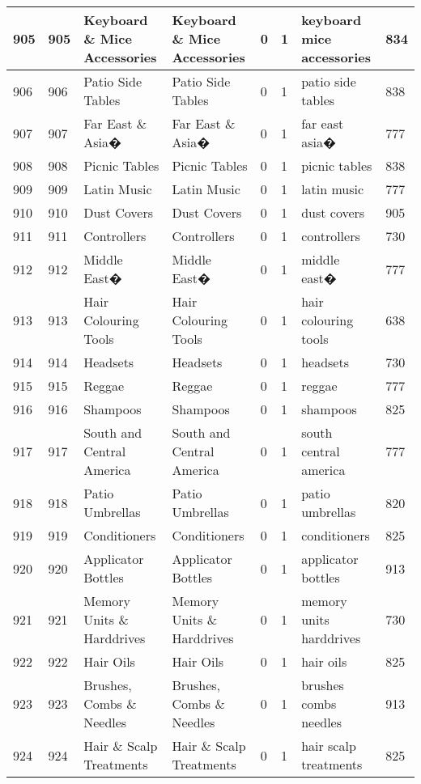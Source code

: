 \begin{longtable}{|l|l|l|l|l|l|l|l|}
905 & 905 & Keyboard \& Mice Accessories & Keyboard \& Mice Accessories & 0 & 1 & keyboard mice accessories & 834 \\ \hline 
906 & 906 & Patio Side Tables & Patio Side Tables & 0 & 1 & patio side tables & 838 \\ \hline 
907 & 907 & Far East \& Asia� & Far East \& Asia� & 0 & 1 & far east asia� & 777 \\ \hline 
908 & 908 & Picnic Tables & Picnic Tables & 0 & 1 & picnic tables & 838 \\ \hline 
909 & 909 & Latin Music & Latin Music & 0 & 1 & latin music & 777 \\ \hline 
910 & 910 & Dust Covers & Dust Covers & 0 & 1 & dust covers & 905 \\ \hline 
911 & 911 & Controllers & Controllers & 0 & 1 & controllers & 730 \\ \hline 
912 & 912 & Middle East� & Middle East� & 0 & 1 & middle east� & 777 \\ \hline 
913 & 913 & Hair Colouring Tools & Hair Colouring Tools & 0 & 1 & hair colouring tools & 638 \\ \hline 
914 & 914 & Headsets & Headsets & 0 & 1 & headsets & 730 \\ \hline 
915 & 915 & Reggae & Reggae & 0 & 1 & reggae & 777 \\ \hline 
916 & 916 & Shampoos & Shampoos & 0 & 1 & shampoos & 825 \\ \hline 
917 & 917 & South and Central America & South and Central America & 0 & 1 & south central america & 777 \\ \hline 
918 & 918 & Patio Umbrellas & Patio Umbrellas & 0 & 1 & patio umbrellas & 820 \\ \hline 
919 & 919 & Conditioners & Conditioners & 0 & 1 & conditioners & 825 \\ \hline 
920 & 920 & Applicator Bottles & Applicator Bottles & 0 & 1 & applicator bottles & 913 \\ \hline 
921 & 921 & Memory Units \& Harddrives & Memory Units \& Harddrives & 0 & 1 & memory units harddrives & 730 \\ \hline 
922 & 922 & Hair Oils & Hair Oils & 0 & 1 & hair oils & 825 \\ \hline 
923 & 923 & Brushes, Combs \& Needles & Brushes, Combs \& Needles & 0 & 1 & brushes combs needles & 913 \\ \hline 
924 & 924 & Hair \& Scalp Treatments & Hair \& Scalp Treatments & 0 & 1 & hair scalp treatments & 825 \\ \hline 

\end{longtable}
